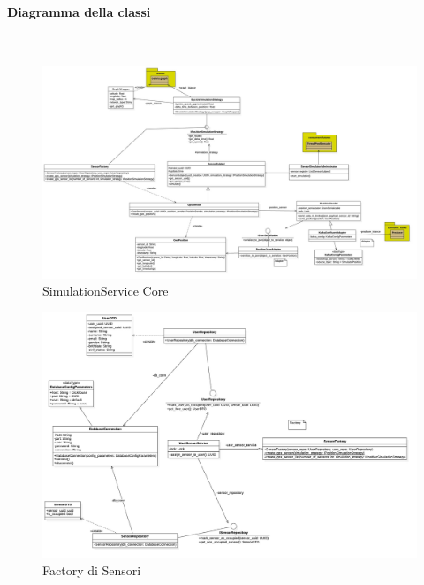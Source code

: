 \documentclass[10pt]{article}
\newcommand{\myparagraph}[1]{\paragraph{#1}\mbox{}\\}
\begin{document}
        
        \myparagraph{Diagramma della classi }


        
        \begin{figure}[H]
        \hspace{-1.5cm} %
        \includegraphics[width=1.24\textwidth]{CoreSimulation.jpg}
        \caption{SimulationService Core}
        \end{figure}

        \begin{figure}[H]
        \hspace{-1.5cm}
        \includegraphics[width=1.25\textwidth]{SensorFactory.jpg}
        \caption{Factory di Sensori}
        \end{figure}
\end{document}
